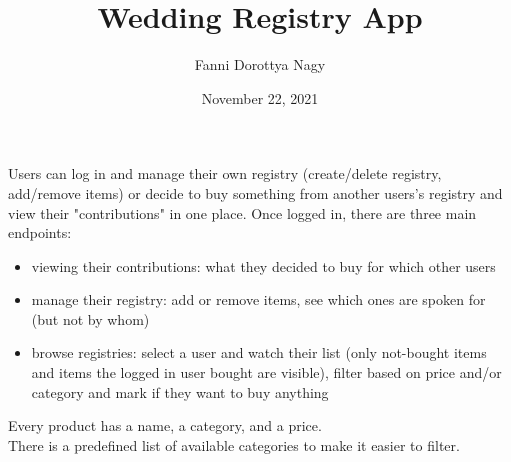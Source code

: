 \documentclass[11pt]{article}
\author{Fanni Dorottya Nagy}
\date{November 22, 2021}
\title{Wedding Registry App}
\begin{document}
    \maketitle
    
    Users can log in and manage their own registry (create/delete registry, add/remove items) or decide to buy something from another users's registry and view their "contributions" in one place.
    Once logged in, there are three main endpoints:
    \begin{itemize}
        \item viewing their contributions: what they decided to buy for which other users
        \item manage their registry: add or remove items, see which ones are spoken for (but not by whom)
        \item browse registries: select a user and watch their list (only not-bought items and items the logged in user bought are visible), filter based on price and/or category and mark if they want to buy anything
    \end{itemize}
    Every product has a name, a category, and a price. \\
    There is a predefined list of available categories to make it easier to filter.
\end{document}

